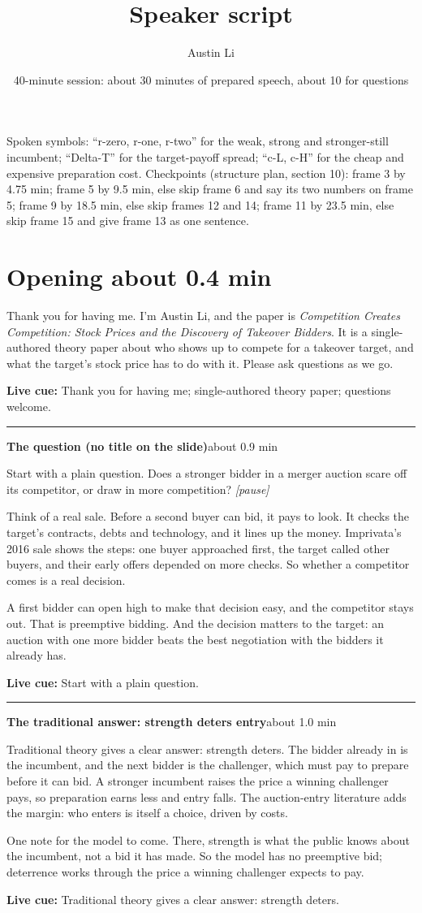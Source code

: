 \documentclass[11pt]{article}
\title{Speaker script\\[0.25em]\large \PaperTitle}
\author{Austin Li}
\date{40-minute session: about 30 minutes of prepared speech, about 10 for questions}
\newcommand{\PaperTitle}{Competition Creates Competition: Stock Prices and the Discovery of Takeover Bidders}
\newcommand{\Pause}{\textcolor{ScriptGray}{\textit{[pause]}}}
\newcommand{\Cue}[1]{\par\nobreak\smallskip\noindent
  \textcolor{ScriptGray}{\footnotesize\textbf{Live cue:} #1}\par}
\newcommand{\scriptopening}[2]{%
  \Needspace{10\baselineskip}%
  \section*{Opening \hfill\normalfont\small\textcolor{ScriptGray}{#1}}
  #2\par}
\newcommand{\scriptframe}[3]{%
  \Needspace{9\baselineskip}%
  \par\medskip\noindent\textcolor{ScriptBlue}{\rule{\linewidth}{0.55pt}}%
  \par\smallskip\noindent
  \textbf{#1}\hfill\textcolor{ScriptGray}{\small #2}\par\smallskip
  #3\par}
\begin{document}
\maketitle
\thispagestyle{fancy}

{\small\textcolor{ScriptGray}{Spoken symbols: ``r-zero, r-one, r-two'' for the weak, strong and
stronger-still incumbent; ``Delta-T'' for the target-payoff spread; ``c-L, c-H'' for the cheap and
expensive preparation cost. Checkpoints (structure plan, section 10): frame 3 by 4.75 min; frame 5 by
9.5 min, else skip frame 6 and say its two numbers on frame 5; frame 9 by 18.5 min, else skip frames
12 and 14; frame 11 by 23.5 min, else skip frame 15 and give frame 13 as one sentence.}\par}

\scriptopening{about 0.4 min}{%
  Thank you for having me. I'm Austin Li, and the paper is \emph{\PaperTitle}.
  It is a single-authored theory paper about who shows up to compete for a
  takeover target, and what the target's stock price has to do with it. Please
  ask questions as we go.
  \Cue{Thank you for having me; single-authored theory paper; questions welcome.}
}

\scriptframe{The question (no title on the slide)}{about 0.9 min}{%
  Start with a plain question. Does a stronger bidder in a merger auction
  scare off its competitor, or draw in more competition? \Pause{}

  Think of a real sale. Before a second buyer can bid, it pays to look. It
  checks the target's contracts, debts and technology, and it lines up the
  money. Imprivata's 2016 sale shows the steps: one buyer approached first,
  the target called other buyers, and their early offers depended on more
  checks. So whether a competitor comes is a real decision.

  A first bidder can open high to make that decision easy, and the competitor
  stays out. That is preemptive bidding. And the decision matters to the
  target: an auction with one more bidder beats the best negotiation with the
  bidders it already has.
  \Cue{Start with a plain question.}
}

\scriptframe{The traditional answer: strength deters entry}{about 1.0 min}{%
  Traditional theory gives a clear answer: strength deters. The bidder already
  in is the incumbent, and the next bidder is the challenger, which must pay to
  prepare before it can bid. A stronger incumbent raises the price a winning
  challenger pays, so preparation earns less and entry falls. The auction-entry
  literature adds the margin: who enters is itself a choice, driven by costs.

  One note for the model to come. There, strength is what the public knows
  about the incumbent, not a bid it has made. So the model has no preemptive
  bid; deterrence works through the price a winning challenger expects to pay.
  \Cue{Traditional theory gives a clear answer: strength deters.}
}
\end{document}
